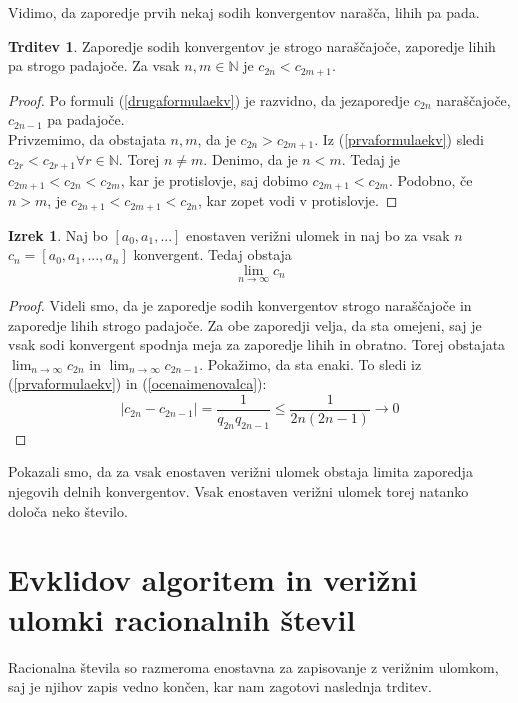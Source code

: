 \documentclass[a4paper,12pt]{article}
\newcommand{\N}{\mathbb{N}}
\theoremstyle{definition}
\theoremstyle{proposition}
\newtheorem{trd}{Trditev}[section]
\theoremstyle{theorem}
\newtheorem{iz}{Izrek}[section]
\theoremstyle{lemma}
\begin{document}
Vidimo, da zaporedje prvih nekaj sodih konvergentov narašča, lihih pa pada.

\begin{trd}
\label{podzaporedji}
Zaporedje sodih konvergentov je strogo naraščajoče, zaporedje lihih pa strogo padajoče. Za vsak $n, m \in \N$ je  $c_{2n} < c_{2m+1}$.
\end{trd}
\begin{proof}
Po formuli (\ref{drugaformulaekv}) je razvidno, da jezaporedje $c_{2n}$ naraščajoče, $c_{2n-1}$ pa padajoče. \\
Privzemimo, da obstajata $n, m$, da je $c_{2n} > c_{2m+1}$. Iz (\ref{prvaformulaekv}) sledi $c_{2r} < c_{2r+1} \forall r \in \N$. Torej $ n \neq m$. Denimo, da je $n < m$. Tedaj je $c_{2m+1} < c_{2n} < c_{2m}$, kar je protislovje, saj dobimo $c_{2m+1} < c_{2m}$. Podobno, če $n > m$, je $c_{2n+1} < c_{2m+1} < c_{2n}$, kar zopet vodi v protislovje.
\end{proof}

\begin{iz}
\label{konvergenca}
Naj bo $[a_0, a_1, ...]$ enostaven verižni ulomek in naj bo za vsak $n$ $c_n = [a_0, a_1, ..., a_n]$ konvergent. Tedaj obstaja $$\lim_{n\to\infty}c_n$$
\end{iz}

\begin{proof}
Videli smo, da je zaporedje sodih konvergentov strogo naraščajoče in zaporedje lihih strogo padajoče. Za obe zaporedji velja, da sta omejeni, saj je vsak sodi konvergent spodnja meja za zaporedje lihih in obratno. Torej obstajata $\lim_{n\to\infty}c_{2n}$ in $\lim_{n\to\infty}c_{2n-1}$. Pokažimo, da sta enaki. To sledi iz (\ref{prvaformulaekv}) in (\ref{ocenaimenovalca}):
\[ \left|c_{2n} - c_{2n-1}\right| = \frac{1}{q_{2n} q_{2n-1}} \leq \frac{1}{2n(2n-1)} \longrightarrow 0 \]
\end{proof}

Pokazali smo, da za vsak enostaven verižni ulomek obstaja limita zaporedja njegovih delnih konvergentov. Vsak enostaven verižni ulomek torej natanko določa neko število.

\section{Evklidov algoritem in verižni ulomki racionalnih števil} \label{racionalna}

Racionalna števila so razmeroma enostavna za zapisovanje z verižnim ulomkom, saj je njihov zapis vedno končen, kar nam zagotovi naslednja trditev.
\end{document}
